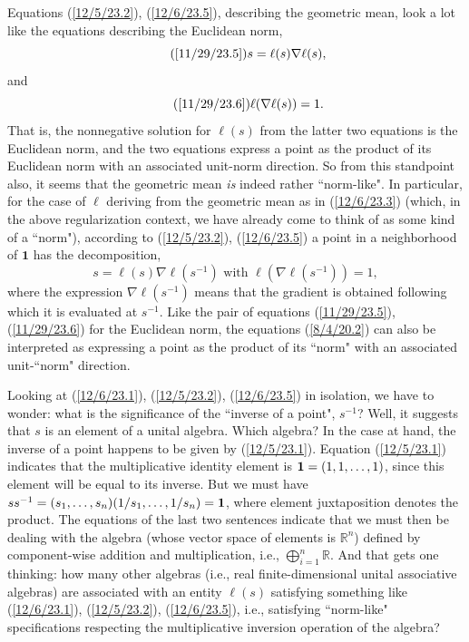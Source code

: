 \documentclass{amsart}
\numberwithin{equation}{section}
\theoremstyle{definition}
\numberwithin{theorem}{section}
\begin{document}
 Equations (\ref{12/5/23.2}), (\ref{12/6/23.5}), describing the geometric mean, look a lot like the equations describing the Euclidean norm,  \begin{equation}\tag{\ref{11/29/23.5}}  s = \ell(s)\nabla\ell(s),\end{equation} and \begin{equation}\tag{\ref{11/29/23.6}} \ell(\nabla\ell(s)) = 1.\end{equation}  That is, the nonnegative solution for $\ell(s)$ from the latter two equations is the Euclidean norm, and the two equations express a point as the product of its Euclidean norm with an associated unit-norm direction.
So from this standpoint also, it seems that the geometric mean {\it is} indeed rather ``norm-like".  In particular, for the case of $\ell$ deriving from the geometric mean as in (\ref{12/6/23.3}) (which, in the above regularization context, we have already come to think of as some kind of a ``norm"), according to (\ref{12/5/23.2}), (\ref{12/6/23.5}) a point in a neighborhood of $\mathbf{1}$ has the decomposition,
\begin{equation}\label{8/4/20.2} s = \ell(s)\nabla \ell(s^{-1}) \mbox{  with   }  \ell(\nabla \ell(s^{-1})) = 1,\end{equation} where the expression $\nabla \ell(s^{-1})$ means that the gradient is obtained following which it is evaluated at $s^{-1}$.  Like the pair of equations (\ref{11/29/23.5}), (\ref{11/29/23.6}) for the Euclidean norm, the equations (\ref{8/4/20.2}) can also be interpreted as expressing a point as the product of its ``norm" with an associated unit-``norm"  direction.


Looking at (\ref{12/6/23.1}), (\ref{12/5/23.2}),  (\ref{12/6/23.5}) in isolation, we have to wonder: what is the significance of the ``inverse of a point", $s^{-1}$?  Well, it suggests that $s$ is an element of a unital algebra.  Which algebra?  In the case at hand, the inverse of a point happens to be given by (\ref{12/5/23.1}).   Equation (\ref{12/5/23.1}) indicates that the multiplicative identity element is ${\bf 1}= (1,1,\dots, 1)$, since this element will be equal to its inverse.  But we must have  $ss^{-1} = (s_1,\dots,s_n)(1/s_1,\dots,1/s_n) = {\bf 1}$, where element juxtaposition denotes the product. The equations of the last two sentences indicate that we must then be dealing with the algebra (whose vector space of elements is $\mathbb{R}^n$) defined by component-wise addition and multiplication, i.e., $\bigoplus_{i=1}^n \mathbb{R}$.  And that gets one thinking: how many other algebras (i.e., real finite-dimensional unital associative algebras) are associated with an entity $\ell(s)$ satisfying something like (\ref{12/6/23.1}), (\ref{12/5/23.2}),  (\ref{12/6/23.5}), i.e., satisfying ``norm-like" specifications respecting the multiplicative inversion operation of the algebra?
 
\end{document}

